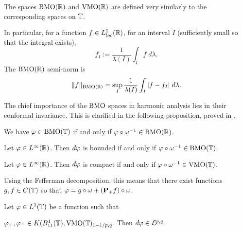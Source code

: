 \begin{definition}
    The spaces $\operatorname{BMO}(\mathbb{R})$ and $\operatorname{VMO}(\mathbb{R})$ are defined
    very similarly to the corresponding spaces on $\mathbb{T}$. 
    
    In particular, for a function $f \in L^1_{loc}(\mathbb{R})$, for
    an interval $I$ (sufficiently small so that the integral exists),
    \begin{equation}
        f_I := \frac{1}{\lambda(I)}\int_I f\;d\lambda.
    \end{equation}
    The $\operatorname{BMO}(\mathbb{R})$ semi-norm is
    \begin{equation}
        \|f\|_{\operatorname{BMO}(\mathbb{R})} = \sup_{I} \frac{1}{\lambda(I)}\int_I |f-f_I|\;d\lambda.
    \end{equation}
\end{definition}

The chief importance of the $\operatorname{BMO}$ spaces in harmonic analysis
lies in their conformal invariance. This is clarified in the following proposition,
proved in \cite[Cor 1.3, p.129]{Garnett},
\begin{proposition}
    We have $\varphi \in \operatorname{BMO}(\mathbb{T})$ if and only if $\varphi \circ \omega^{-1} \in \operatorname{BMO}(\mathbb{R})$.
\end{proposition}

\begin{proposition}
    Let $\varphi \in L^\infty(\mathbb{R})$. Then $\qd \varphi$
    is bounded if and only if $\varphi \circ \omega^{-1} \in \operatorname{BMO}(\mathbb{T})$.
\end{proposition}
\begin{proposition}
    Let $\varphi \in L^\infty(\mathbb{R})$. Then $\qd \varphi$ is compact
    if and only if $\varphi \circ \omega^{-1} \in \operatorname{VMO}(\mathbb{T})$.
    
    Using the Fefferman decomposition, this means that 
    there exist functions $g,f \in C(\mathbb{T})$ so that
    $\varphi = g\circ\omega + (\mathbf{P}_+f)\circ \omega$. 
\end{proposition}

\begin{proposition}
    Let $\varphi\in L^1(\mathbb{T})$ be a function such that
    
    $\varphi_+,\varphi_- \in K(B_{11}^1(\mathbb{T}),\operatorname{VMO}(\mathbb{T})_{1-1/p,q}$. Then $\qd \varphi \in \mathcal{L}^{p,q}$.
\end{proposition}

